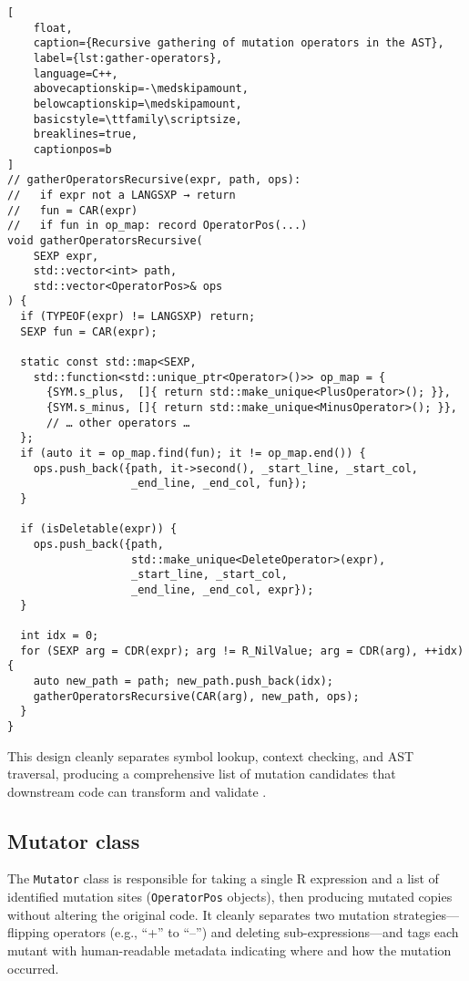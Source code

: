 \begin{lstlisting}[
    float,
    caption={Recursive gathering of mutation operators in the AST},
    label={lst:gather-operators},
    language=C++,
    abovecaptionskip=-\medskipamount,
    belowcaptionskip=\medskipamount,
    basicstyle=\ttfamily\scriptsize,
    breaklines=true,
    captionpos=b
]
// gatherOperatorsRecursive(expr, path, ops):
//   if expr not a LANGSXP → return
//   fun = CAR(expr)
//   if fun in op_map: record OperatorPos(...)
void gatherOperatorsRecursive(
    SEXP expr,
    std::vector<int> path,
    std::vector<OperatorPos>& ops
) {
  if (TYPEOF(expr) != LANGSXP) return;
  SEXP fun = CAR(expr);

  static const std::map<SEXP,
    std::function<std::unique_ptr<Operator>()>> op_map = {
      {SYM.s_plus,  []{ return std::make_unique<PlusOperator>(); }},
      {SYM.s_minus, []{ return std::make_unique<MinusOperator>(); }},
      // … other operators …
  };
  if (auto it = op_map.find(fun); it != op_map.end()) {
    ops.push_back({path, it->second(), _start_line, _start_col,
                   _end_line, _end_col, fun});
  }

  if (isDeletable(expr)) {
    ops.push_back({path,
                   std::make_unique<DeleteOperator>(expr),
                   _start_line, _start_col,
                   _end_line, _end_col, expr});
  }

  int idx = 0;
  for (SEXP arg = CDR(expr); arg != R_NilValue; arg = CDR(arg), ++idx) {
    auto new_path = path; new_path.push_back(idx);
    gatherOperatorsRecursive(CAR(arg), new_path, ops);
  }
}
\end{lstlisting}


This design cleanly separates symbol lookup, context checking, and AST traversal, producing a comprehensive list of mutation candidates that downstream code can transform and validate \cite{R-base}.

\subsection{Mutator class}

The \texttt{Mutator} class is responsible for taking a single R expression and a list of identified mutation sites (\texttt{OperatorPos} objects), then producing mutated copies without altering the original code. It cleanly separates two mutation strategies—flipping operators (e.g., “+” to “–”) and deleting sub-expressions—and tags each mutant with human-readable metadata indicating where and how the mutation occurred.

